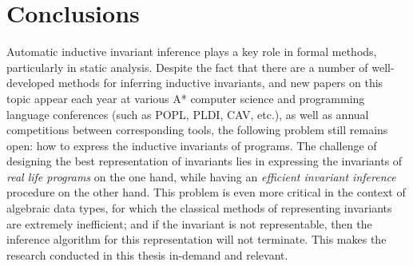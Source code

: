 \section{Conclusions}\label{sec:background/conclusion}
Automatic inductive invariant inference plays a key role in formal methods, particularly in static analysis.
Despite the fact that there are a number of well-developed methods for inferring inductive invariants,
and new papers on this topic appear each year at various A* computer science and programming language conferences (such as POPL, PLDI, CAV, etc.), as well as annual competitions between corresponding tools, 
the following problem still remains open: how to express the inductive invariants of programs.
The challenge of designing the best representation of invariants lies in expressing the invariants of \emph{real life programs} on the one hand, while having an \emph{efficient invariant inference} procedure on the other hand.
This problem is even more critical in the context of algebraic data types, for which the classical methods of representing invariants are extremely inefficient; and if the invariant is not representable, then the inference algorithm for this representation will not terminate.
This makes the research conducted in this thesis in-demand and relevant.